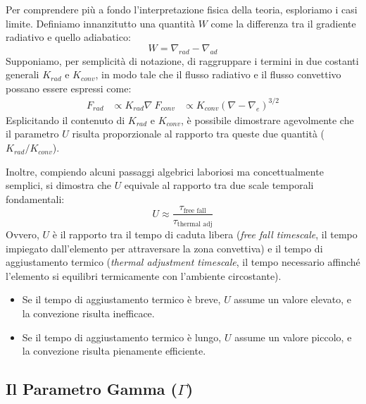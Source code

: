 Per comprendere più a fondo l'interpretazione fisica della teoria, esploriamo i casi limite. Definiamo innanzitutto una quantità $W$ come la differenza tra il gradiente radiativo e quello adiabatico:
\begin{equation}
W = \nabla_{rad} - \nabla_{ad}
\end{equation}
Supponiamo, per semplicità di notazione, di raggruppare i termini in due costanti generali $K_{rad}$ e $K_{conv}$, in modo tale che il flusso radiativo e il flusso convettivo possano essere espressi come:
\begin{align}
F_{rad} &\propto K_{rad} \nabla \
F_{conv} &\propto K_{conv} (\nabla - \nabla_{e})^{3/2}
\end{align}
Esplicitando il contenuto di $K_{rad}$ e $K_{conv}$, è possibile dimostrare agevolmente che il parametro $U$ risulta proporzionale al rapporto tra queste due quantità ($K_{rad} / K_{conv}$).

Inoltre, compiendo alcuni passaggi algebrici laboriosi ma concettualmente semplici, si dimostra che $U$ equivale al rapporto tra due scale temporali fondamentali:
\begin{equation}
U \approx \frac{\tau_{\text{free fall}}}{\tau_{\text{thermal adj}}}
\end{equation}
Ovvero, $U$ è il rapporto tra il tempo di caduta libera (\textit{free fall timescale}, il tempo impiegato dall'elemento per attraversare la zona convettiva) e il tempo di aggiustamento termico (\textit{thermal adjustment timescale}, il tempo necessario affinché l'elemento si equilibri termicamente con l'ambiente circostante).
\begin{itemize}
\item Se il tempo di aggiustamento termico è breve, $U$ assume un valore elevato, e la convezione risulta inefficace.
\item Se il tempo di aggiustamento termico è lungo, $U$ assume un valore piccolo, e la convezione risulta pienamente efficiente.
\end{itemize}

\subsection{Il Parametro Gamma ($\Gamma$)}

